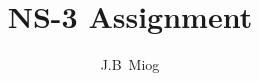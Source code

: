 \documentclass[whitelogo]{tudelft-report}
\begin{document}
\frontmatter


\title[tudelft-white]{NS-3 Assignment} 
\subtitle[tudelft-black]{}
\author[tudelft-white]{J.B\ Miog}
\makecover[split]




%

\tableofcontents

\mainmatter

 




 

\appendix

%


\end{document}
